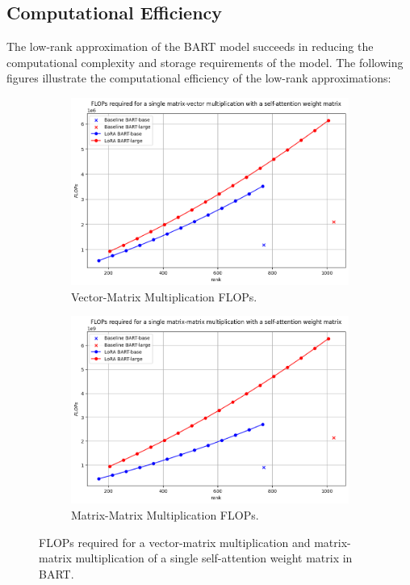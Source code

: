 \subsection{Computational Efficiency}
The low-rank approximation of the BART model succeeds in reducing the computational complexity and storage requirements of the model. The following figures illustrate the computational efficiency of the low-rank approximations:
\begin{figure}[h!]
    \centering
    \begin{subfigure}[b]{0.45\textwidth}
        \centering
        \includegraphics[width=\textwidth]{figs/flops_vector.png}
        \caption{Vector-Matrix Multiplication FLOPs.}
        \label{fig:subfigure1}
    \end{subfigure}
    \hfill
    \begin{subfigure}[b]{0.45\textwidth}
        \centering
        \includegraphics[width=\textwidth]{figs/flops_matrix.png}
        \caption{Matrix-Matrix Multiplication FLOPs.}
        \label{fig:subfigure2}
    \end{subfigure}
    \caption{FLOPs required for a vector-matrix multiplication and matrix-matrix multiplication of a single self-attention weight matrix in BART.}
    \label{fig:mainfigure}
\end{figure}

